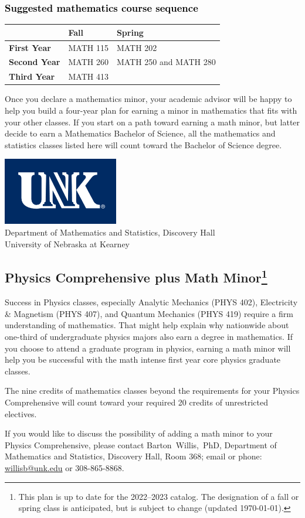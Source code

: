 \documentclass[10pt]{article}
\makeatletter
\newcommand{\calconeshort}{MATH 115}
\newcommand{\calctwoshort}{MATH 202}
\newcommand{\foundationsshort}{MATH 250}
\newcommand{\calcthreeshort}{MATH 260}
\newcommand{\linearshort}{MATH 280}
\newcommand{\discreteshort}{MATH 413}
\newcommand{\contactbw}{\mbox{Barton Willis, PhD}, Department of Mathematics and Statistics,  Discovery Hall, Room 368;
email or phone: \href{mailto:willisb@unk.edu}{willisb@unk.edu} or 308-865-8868.}
\newcommand{\forinfo}[2]{If you would like to discuss the possibility of adding a math {#1} to your {#2}, please contact \contactbw}
\newcommand{\catalog}{2022--2023 }
\newcommand{\myfootnote}{\footnote{This plan is up to date for  the \catalog catalog. The designation of a fall or spring class is 
anticipated, but  is subject to change (updated  \today).}}
\newcommand{\myheading}{
\begin{flushleft}
\includegraphics[scale=0.35]{unk-logo}\\
\setcounter{footnote}{0}
\vspace{0.25in}
 \textcolor{unkblue}{Department of Mathematics and Statistics, Discovery Hall} \\
  \textcolor{unkblue}{University of Nebraska at Kearney}
\end{flushleft}}
\makeatother
\begin{document}
\vspace{-0.1in}
\subsubsection*{\textcolor{black}{Suggested mathematics course sequence}}

\begin{tabular}[h]{| l | l | l|} 
   \hline
              & \textbf{Fall}         &  \textbf{Spring}  \\ \hline 
   \textbf{First Year} & \calconeshort & \calctwoshort \\  \hline
   \textbf{Second Year} &  \calcthreeshort & \foundationsshort{}  and \linearshort \\ \hline
   \textbf{Third Year} &    \discreteshort              &  \\ \hline
   \end{tabular}

\noindent Once you declare a mathematics minor, your academic advisor 
will be happy to help you build a four-year plan for earning a minor 
in mathematics that fits with your other classes.  If you start on 
a path toward earning a math minor, but latter decide to earn a  
Mathematics Bachelor of Science, all the mathematics and statistics  classes listed here will count toward the Bachelor of Science degree.


\newpage

\myheading


\subsection*{\textbf{\textcolor{unkblue}{Physics Comprehensive plus Math Minor\myfootnote}}}

\noindent Success in Physics classes, especially  Analytic Mechanics (PHYS 402), Electricity \& Magnetism (PHYS 407), and Quantum Mechanics (PHYS 419) require a firm understanding of mathematics. That might help explain why nationwide about one-third of undergraduate physics majors also earn a degree in mathematics. If you choose to attend a graduate program in physics, earning a math minor will help you be successful with the math intense first year core physics graduate classes.

The nine credits of mathematics classes beyond the requirements for your Physics Comprehensive will count toward your required 20 credits of unrestricted electives.


\forinfo{minor}{Physics Comprehensive}
\end{document}
